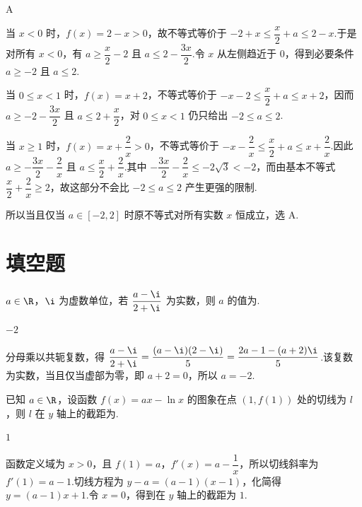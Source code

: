 \begin{answer}
A
\end{answer}

\begin{solution}
当 \(x<0\) 时，\(f(x)=2-x>0\)，故不等式等价于
\(-2+x\le\dfrac x2+a\le2-x\).于是对所有 \(x<0\)，有 \(a\ge\dfrac x2-2\) 且 \(a\le2-\dfrac{3x}{2}\).令 \(x\) 从左侧趋近于 \(0\)，得到必要条件 \(a\ge-2\) 且 \(a\le2\).

当 \(0\le x<1\) 时，\(f(x)=x+2\)，不等式等价于 \(-x-2\le\dfrac x2+a\le x+2\)，因而 \(a\ge-2-\dfrac{3x}{2}\) 且 \(a\le2+\dfrac x2\)，对 \(0\le x<1\) 仍只给出 \(-2\le a\le2\).

当 \(x\ge1\) 时，\(f(x)=x+\dfrac2x>0\)，不等式等价于
\(-x-\dfrac2x\le\dfrac x2+a\le x+\dfrac2x\).因此
\(a\ge-\dfrac{3x}{2}-\dfrac2x\) 且 \(a\le\dfrac x2+\dfrac2x\).其中 \(-\dfrac{3x}{2}-\dfrac2x\le-2\sqrt3<-2\)，而由基本不等式 \(\dfrac x2+\dfrac2x\ge2\)，故这部分不会比 \(-2\le a\le2\) 产生更强的限制.

所以当且仅当 \(a\in[-2,2]\) 时原不等式对所有实数 \(x\) 恒成立，选 A.
\end{solution}

\section{填空题}

\begin{problem}
\(a\in\R\)，\(\i\) 为虚数单位，若 \(\dfrac{a-\i}{2+\i}\) 为实数，则 \(a\) 的值为\fillinblank{}.
\end{problem}

\begin{answer}
\(-2\)
\end{answer}

\begin{solution}
分母乘以共轭复数，得
\(\dfrac{a-\i}{2+\i}=\dfrac{(a-\i)(2-\i)}{5}=\dfrac{2a-1-(a+2)\i}{5}\).该复数为实数，当且仅当虚部为零，即 \(a+2=0\)，所以 \(a=-2\).
\end{solution}

\begin{problem}
已知 \(a\in\R\)，设函数 \(f(x)=ax-\ln x\) 的图象在点 \((1,f(1))\) 处的切线为 \(l\)，则 \(l\) 在 \(y\) 轴上的截距为\fillinblank{}.
\end{problem}

\begin{answer}
\(1\)
\end{answer}

\begin{solution}
函数定义域为 \(x>0\)，且 \(f(1)=a\)，\(f'(x)=a-\dfrac1x\)，所以切线斜率为 \(f'(1)=a-1\).切线方程为 \(y-a=(a-1)(x-1)\)，化简得 \(y=(a-1)x+1\).令 \(x=0\)，得到在 \(y\) 轴上的截距为 \(1\).
\end{solution}

